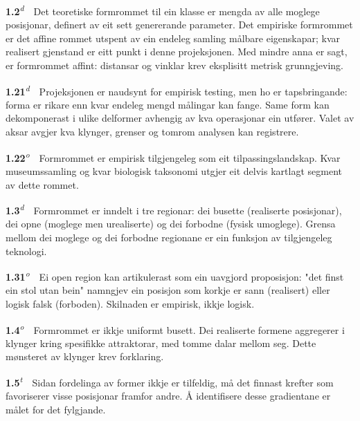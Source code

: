 \documentclass[10pt]{article}
\begin{document}
\noindent\textbf{1.2}\textsuperscript{\textit{d}}~~Det teoretiske formrommet til ein klasse er mengda av alle moglege posisjonar, definert av eit sett genererande parameter. Det empiriske formrommet er det affine rommet utspent av ein endeleg samling målbare eigenskapar; kvar realisert gjenstand er eitt punkt i denne projeksjonen. Med mindre anna er sagt, er formrommet affint: distansar og vinklar krev eksplisitt metrisk grunngjeving.




\noindent\textbf{1.21}\textsuperscript{\textit{d}}~~Projeksjonen er naudsynt for empirisk testing, men ho er tapsbringande: forma er rikare enn kvar endeleg mengd målingar kan fange. Same form kan dekomponerast i ulike delformer avhengig av kva operasjonar ein utfører. Valet av aksar avgjer kva klynger, grenser og tomrom analysen kan registrere.




\noindent\textbf{1.22}\textsuperscript{\textit{o}}~~Formrommet er empirisk tilgjengeleg som eit tilpassingslandskap. Kvar museumssamling og kvar biologisk taksonomi utgjer eit delvis kartlagt segment av dette rommet.




\noindent\textbf{1.3}\textsuperscript{\textit{d}}~~Formrommet er inndelt i tre regionar: dei busette (realiserte posisjonar), dei opne (moglege men urealiserte) og dei forbodne (fysisk umoglege). Grensa mellom dei moglege og dei forbodne regionane er ein funksjon av tilgjengeleg teknologi.




\noindent\textbf{1.31}\textsuperscript{\textit{o}}~~Ei open region kan artikulerast som ein uavgjord proposisjon: "det finst ein stol utan bein" namngjev ein posisjon som korkje er sann (realisert) eller logisk falsk (forboden). Skilnaden er empirisk, ikkje logisk.




\noindent\textbf{1.4}\textsuperscript{\textit{o}}~~Formrommet er ikkje uniformt busett. Dei realiserte formene aggregerer i klynger kring spesifikke attraktorar, med tomme dalar mellom seg. Dette mønsteret av klynger krev forklaring.




\noindent\textbf{1.5}\textsuperscript{\textit{t}}~~Sidan fordelinga av former ikkje er tilfeldig, må det finnast krefter som favoriserer visse posisjonar framfor andre. Å identifisere desse gradientane er målet for det fylgjande.
\end{document}
